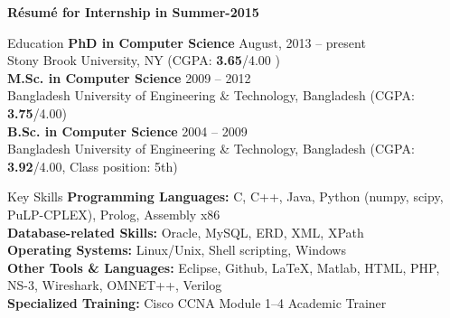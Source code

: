 \documentclass{resume} %
\begin{document}
 \titlespacing{\section}{0pt}{\parskip}{-\parskip}
 \begin{center}
 {\Small \normalfont \textbf{R\'esum\'e for Internship in Summer-2015}}
 \end{center}
\begin{rSection}{Education}
{\bf PhD in Computer Science} \hfill {August, 2013 -- present} \\ 
Stony Brook University, NY (CGPA: \textbf{3.65}/4.00 ) \\ [4pt]
{\bf M.Sc. in Computer Science} \hfill {2009 -- 2012} \\ 
Bangladesh University of Engineering \& Technology, Bangladesh (CGPA:
\textbf{3.75}/4.00) \\[4pt] {\bf B.Sc. in Computer Science} \hfill {2004 --
2009}
\\
Bangladesh University of Engineering \& Technology, Bangladesh (CGPA:
\textbf{3.92}/4.00, Class position: 5th)
\end{rSection}
\begin{rSection}{Key Skills}
\textbf{Programming Languages: }C, C++, Java, Python (numpy, scipy, PuLP-CPLEX),
Prolog, Assembly x86
\\
\textbf{Database-related Skills: } Oracle, MySQL, ERD, XML, XPath\\ 
\textbf{Operating Systems: }Linux/Unix, Shell scripting, Windows\\ 
\textbf{Other Tools \& Languages: }Eclipse, Github, \LaTeX{}, Matlab, HTML,
PHP, NS-3, Wireshark, OMNET++, Verilog\\
\textbf{Specialized Training: }Cisco CCNA Module 1--4 Academic Trainer 
\end{rSection}  
\end{document}
